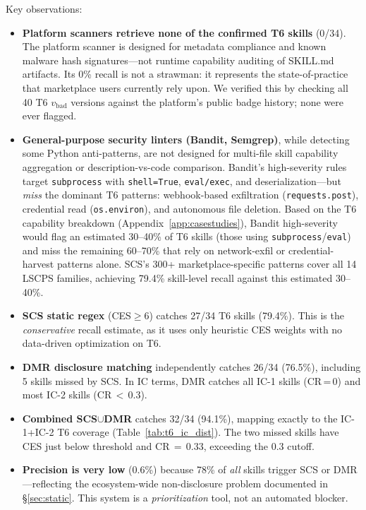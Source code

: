 Key observations:
\begin{itemize}
\item \textbf{Platform scanners retrieve none of the confirmed T6 skills} (0/34).
The platform scanner is designed for metadata compliance and known
malware hash signatures---not runtime capability auditing of SKILL.md artifacts.
Its 0\% recall is not a strawman: it represents the state-of-practice that
marketplace users currently rely upon.
We verified this by checking all 40 T6 $v_{\text{bad}}$ versions against
the platform's public badge history; none were ever flagged.

\item \textbf{General-purpose security linters (Bandit, Semgrep)},
while detecting some Python anti-patterns, are not designed for
multi-file skill capability aggregation or description-vs-code comparison.
Bandit's high-severity rules target \texttt{subprocess} with \texttt{shell=True},
\texttt{eval/exec}, and deserialization---but \emph{miss} the dominant T6 patterns:
webhook-based exfiltration (\texttt{requests.post}), credential read
(\texttt{os.environ}), and autonomous file deletion.
Based on the T6 capability breakdown (Appendix~\ref{app:casestudies}),
Bandit high-severity would flag an estimated 30--40\% of T6 skills
(those using \texttt{subprocess}/\texttt{eval}) and miss the remaining 60--70\%
that rely on network-exfil or credential-harvest patterns alone.
SCS's 300+ marketplace-specific patterns cover all 14 LSCPS families,
achieving 79.4\% skill-level recall against this estimated 30--40\%.

\item \textbf{SCS static regex} (CES$\geq$6) catches
27/34 T6 skills (79.4\%). This is the \emph{conservative}
recall estimate, as it uses only heuristic CES weights
with no data-driven optimization on T6.
\item \textbf{DMR disclosure matching} independently catches
26/34 (76.5\%), including 5 skills missed by SCS.
In IC terms, DMR catches all IC-1 skills (CR\,=\,0)
and most IC-2 skills (CR\,$<$\,0.3).
\item \textbf{Combined SCS$\cup$DMR} catches 32/34 (94.1\%),
mapping exactly to the IC-1+IC-2 T6 coverage
(Table~\ref{tab:t6_ic_dist}).
The two missed skills have CES just below threshold
and CR\,$=$\,0.33, exceeding the 0.3 cutoff.
\item \textbf{Precision is very low} (0.6\%) because 78\%
of \emph{all} skills trigger SCS or DMR---reflecting the
ecosystem-wide non-disclosure problem documented in
\S\ref{sec:static}. This system is a \emph{prioritization}
tool, not an automated blocker.
\end{itemize}

